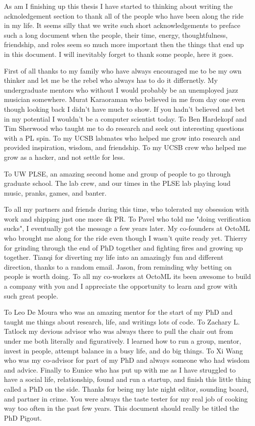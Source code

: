 As am I finishing up this thesis I have started to thinking about writing the
    acknoledgement section to thank all of the people who have been along the ride
    in my life.
It seems silly that we write such short acknowledgements to preface such a long
    document when the people, their time, energy, thoughtfulness, friendship,
    and roles seem so much more important then the things that end up in this
    document.
I will inevitably forget to thank some people, here it goes.

First of all thanks to my family who have always encouraged
    me to be my own thinker and let me be the rebel who
    always has to do it differnetly.
My undergraduate mentors who without I would probably be an unemployed
    jazz musician somewhere.
Murat Karaoraman who believed in me from day one even though looking
    back I didn't have much to show.
If you hadn't believed and bet in my potential I wouldn't be a computer scientist today.
To Ben Hardekopf and Tim Sherwood who taught me to do research
    and seek out interesting questions with a PL spin.
To my UCSB labmates who helped me grow into research and
    provided inspiration, wisdom, and friendship.
To my UCSB crew who helped me grow as a hacker, and
    not settle for less.

To UW PLSE, an amazing second home and group of people to
    go through graduate school.
The lab crew, and our times in the PLSE lab playing loud
    music, pranks, games, and banter.



To all my partners and friends during this time, who tolerated
    my obsession with work and shipping just one more 4k PR.
To Pavel who told me "doing verification sucks",
    I eventually got the message a few years later.
My co-founders at OctoML who brought me along for the ride
    even though I wasn't quite ready yet.
Thierry for grinding through the end of PhD together and
    fighting fires and growing up together.
Tianqi for diverting my life into an amazingly fun and
    different direction, thanks to a random email.
Jason, from reminding why betting on people is worth doing.
To all my co-workers at OctoML its been awesome to build
    a company with you and I appreciate the opportunity to
    learn and grow with such great people.

To Leo De Moura who was an amazing mentor for the start of
    my PhD and taught me things about research, life, and writings lots of code.
To Zachary L. Tatlock my devious advisor who was always there
    to pull the chair out from under me both literally and figuratively.
I learned how to run a group, mentor, invest in people, attempt
    balance in a busy life, and do big things.
To Xi Wang who was my co-advisor for part of my PhD
    and always someone who had wisdom and advice.
Finally to Eunice who has put up with me as I have struggled
    to have a social life, relationship, found and run a startup,
    and finish this little thing called a PhD on the side.
Thanks for being my late night editor, sounding board, and
    partner in crime.
You were always the taste tester for my real job
    of cooking way too often in the past few years.
This document should really be titled the PhD Pigout.
